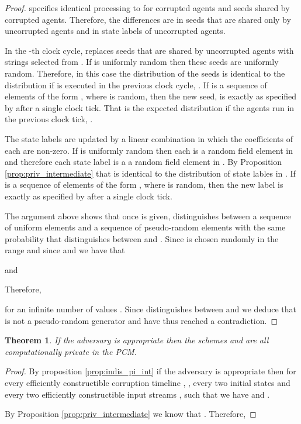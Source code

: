\documentclass[letterpaper,11pt]{article}
\newtheorem{theorem}{Theorem}[section]
\begin{document}
\begin{proof}
 specifies identical processing to  for corrupted agents and seeds shared by corrupted agents. Therefore, the  differences are in seeds that are shared only by uncorrupted agents and in state labels of uncorrupted agents. 

In the -th clock cycle,  replaces seeds that are shared by uncorrupted agents with strings selected from . If  is uniformly random then these seeds are uniformly random. Therefore, in this case the distribution of the seeds is identical to the distribution if  is executed in the previous clock cycle, . If  is a sequence of elements of the form , where  is random, then the new seed,  is exactly as specified by  after a single clock tick. That is the expected distribution if the agents run  in the previous clock tick, .

The state labels are updated by a linear combination in which the coefficients of each  are non-zero. If  is uniformly random then each  is a random field element in  and therefore each state label is a a random field element in . By Proposition \ref{prop:priv_intermediate} that is identical to the distribution of state lables in . If  is a sequence of elements of the form , where  is random, then the new label is exactly as specified by  after a single clock tick.

The argument above shows that once  is given,  distinguishes between a sequence of uniform elements and a sequence of pseudo-random elements with the same probability that  distinguishes between  and . Since  is chosen randomly in the range  and since  and  we have that 

and


Therefore,


	 
for an infinite number of values . Since  distinguishes between  and  we deduce that  is not a pseudo-random generator and have thus reached a contradiction.
\end{proof}

\begin{theorem}
If the adversary is appropriate then the schemes  and  are all computationally private in the PCM. 
\end{theorem}
\begin{proof}
By proposition \ref{prop:indis_pi_int} if the adversary is appropriate then for every efficiently constructible corruption timeline , , every two initial states  and every two efficiently constructible input streams , such that  we have  and .

By Proposition \ref{prop:priv_intermediate} we know that
. Therefore,

\end{proof}
\end{document}
